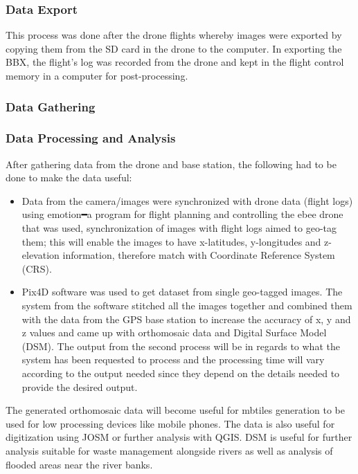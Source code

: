 \documentclass[a4paper,12pt,twoside]{article}
\begin{document}
    \subsubsection{Data Export}
        This process was done after the drone flights whereby images were exported by copying them from the SD card in the drone to the computer. In exporting the BBX, the flight’s log was recorded from the drone and kept in the flight control memory in a computer for post-processing. 
    
    \subsubsection{Data Gathering}
    
    \subsubsection{Data Processing and Analysis}
        After gathering data from the drone and base station, the following had to be done to make the data useful:
        \begin{itemize}
            \item Data from the camera/images were synchronized with drone data (flight logs) using emotion━a program for flight planning and controlling the ebee drone that was used, synchronization of images with flight logs aimed to geo-tag them; this will enable the images to have x-latitudes, y-longitudes and z-elevation information, therefore match with Coordinate Reference System (CRS).
            \item Pix4D software was used to get dataset from single geo-tagged images. The system from the software stitched all the images together and combined them with the data from the GPS base station to increase the accuracy of x, y and z values and came up with orthomosaic data and Digital Surface Model (DSM). The output from the second process will be in regards to what the system has been requested to process and the processing time will vary according to the output needed since they depend on the details needed to provide the desired output.
        \end{itemize}
    
        The generated orthomosaic data will become useful for mbtiles generation to be used for low processing devices like mobile phones. The data is also useful for digitization using JOSM or further analysis with QGIS. DSM is useful for further analysis suitable for waste management alongside rivers as well as analysis of flooded areas near the river banks.
    
\end{document}
